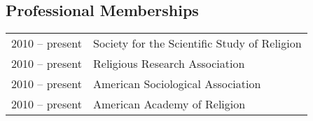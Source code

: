 \subsection*{Professional Memberships}
\begin{tabular}{p{} p{}}
	2010 -- present & Society for the Scientific Study of Religion\\
	2010 -- present & Religious Research Association\\
	2010 -- present & American Sociological Association\\
	2010 -- present & American Academy of Religion\\
\end{tabular}